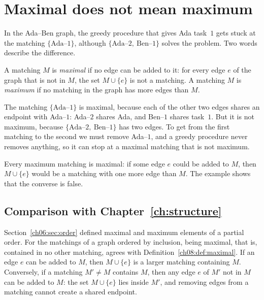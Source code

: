\section{Maximal does not mean maximum}\label{ch08:sec:maximal}
In the Ada--Ben graph, the greedy procedure that gives Ada task~$1$ gets stuck at the matching $\{\text{Ada--}1\}$, although $\{\text{Ada--}2,\ \text{Ben--}1\}$ solves the problem. Two words describe the difference.

\par\noindent\begin{minipage}{\linewidth}
\begin{definition}\label{ch08:def:maximal}
A matching $M$ is \emph{maximal} if no edge can be added to it: for every edge $e$ of the graph that is not in $M$, the set $M\cup\{e\}$ is not a matching. A matching $M$ is \emph{maximum} if no matching in the graph has more edges than $M$.
\end{definition}
\end{minipage}\par

The matching $\{\text{Ada--}1\}$ is maximal, because each of the other two edges shares an endpoint with Ada--$1$: Ada--$2$ shares Ada, and Ben--$1$ shares task~$1$. But it is not maximum, because $\{\text{Ada--}2,\ \text{Ben--}1\}$ has two edges. To get from the first matching to the second we must remove Ada--$1$, and a greedy procedure never removes anything, so it can stop at a maximal matching that is not maximum.

Every maximum matching is maximal: if some edge $e$ could be added to $M$, then $M\cup\{e\}$ would be a matching with one more edge than $M$. The example shows that the converse is false.


\subsection*{Comparison with Chapter~\ref{ch:structure}}
Section~\ref{ch06:sec:order} defined maximal and maximum elements of a partial order. For the matchings of a graph ordered by inclusion, being maximal, that is, contained in no other matching, agrees with Definition~\ref{ch08:def:maximal}. If an edge $e$ can be added to $M$, then $M\cup\{e\}$ is a larger matching containing $M$. Conversely, if a matching $M'\ne M$ contains $M$, then any edge $e$ of $M'$ not in $M$ can be added to $M$: the set $M\cup\{e\}$ lies inside $M'$, and removing edges from a matching cannot create a shared endpoint.

